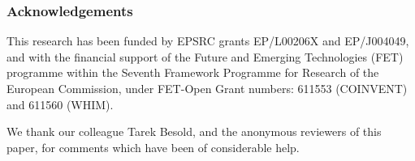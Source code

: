 \documentclass{article} %
\begin{document}




\tableofcontents

\newpage




% 
% 
% 
















\subsubsection*{Acknowledgements}
This research has been funded by EPSRC grants EP/L00206X and
EP/J004049, and with the financial support of the Future and Emerging
Technologies (FET) programme within the Seventh Framework Programme
for Research of the European Commission, under FET-Open Grant numbers:
611553 (COINVENT) and 611560 (WHIM).

We thank our colleague Tarek Besold, and the anonymous reviewers of
this paper, for comments which have been of considerable help.




% 
\end{document}
